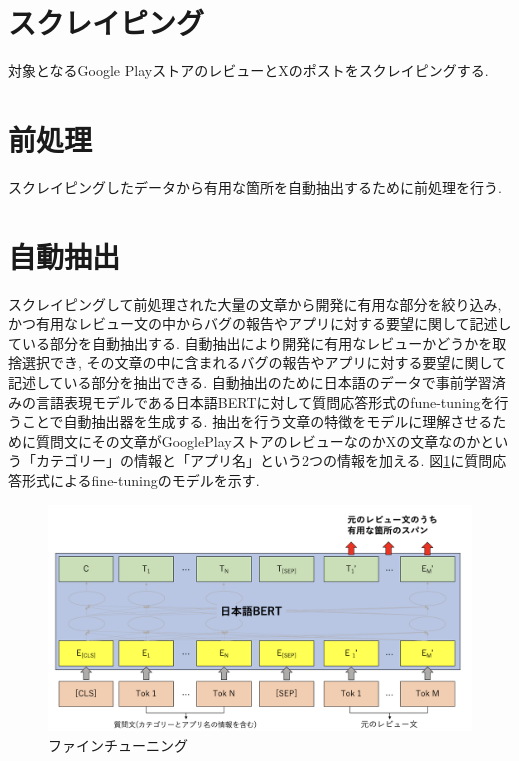 
\section{スクレイピング}
対象となるGoogle PlayストアのレビューとXのポストをスクレイピングする. 


\section{前処理}
スクレイピングしたデータから有用な箇所を自動抽出するために前処理を行う. 


\section{自動抽出}
スクレイピングして前処理された大量の文章から開発に有用な部分を絞り込み, かつ有用なレビュー文の中からバグの報告やアプリに対する要望に関して記述している部分を自動抽出する. 自動抽出により開発に有用なレビューかどうかを取捨選択でき, その文章の中に含まれるバグの報告やアプリに対する要望に関して記述している部分を抽出できる. 自動抽出のために日本語のデータで事前学習済みの言語表現モデルである日本語BERTに対して質問応答形式のfune-tuningを行うことで自動抽出器を生成する. 
抽出を行う文章の特徴をモデルに理解させるために質問文にその文章がGooglePlayストアのレビューなのかXの文章なのかという「カテゴリー」の情報と「アプリ名」という2つの情報を加える. 図\ref{chap:fine-tuning}に質問応答形式によるfine-tuningのモデルを示す. 
\begin{figure}[hbtp]
  \centering
  \includegraphics[scale=0.3]
       {contents/images/fine-tuning.png}
  \caption{ファインチューニング\label{chap:fine-tuning}}
 \end{figure}

